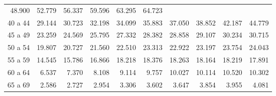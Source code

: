 \begin{tabular}{llllllllll}
  \multicolumn{1}{r}{48.900} &
  \multicolumn{1}{r}{52.779} &
  \multicolumn{1}{r}{56.337} &
  \multicolumn{1}{r}{59.596} &
  \multicolumn{1}{r}{63.295} &
  \multicolumn{1}{r}{64.723} \\
\multicolumn{1}{l}{\hspace{1em}40 a 44} &
  \multicolumn{1}{|r}{29.144} &
  \multicolumn{1}{r}{30.723} &
  \multicolumn{1}{r}{32.198} &
  \multicolumn{1}{r}{34.099} &
  \multicolumn{1}{r}{35.883} &
  \multicolumn{1}{r}{37.050} &
  \multicolumn{1}{r}{38.852} &
  \multicolumn{1}{r}{42.187} &
  \multicolumn{1}{r}{44.779} \\
\multicolumn{1}{l}{\hspace{1em}45 a 49} &
  \multicolumn{1}{|r}{23.259} &
  \multicolumn{1}{r}{24.569} &
  \multicolumn{1}{r}{25.795} &
  \multicolumn{1}{r}{27.332} &
  \multicolumn{1}{r}{28.382} &
  \multicolumn{1}{r}{28.858} &
  \multicolumn{1}{r}{29.107} &
  \multicolumn{1}{r}{30.234} &
  \multicolumn{1}{r}{30.715} \\
\multicolumn{1}{l}{\hspace{1em}50 a 54} &
  \multicolumn{1}{|r}{19.807} &
  \multicolumn{1}{r}{20.727} &
  \multicolumn{1}{r}{21.560} &
  \multicolumn{1}{r}{22.510} &
  \multicolumn{1}{r}{23.313} &
  \multicolumn{1}{r}{22.922} &
  \multicolumn{1}{r}{23.197} &
  \multicolumn{1}{r}{23.754} &
  \multicolumn{1}{r}{24.043} \\
\multicolumn{1}{l}{\hspace{1em}55 a 59} &
  \multicolumn{1}{|r}{14.545} &
  \multicolumn{1}{r}{15.786} &
  \multicolumn{1}{r}{16.866} &
  \multicolumn{1}{r}{18.218} &
  \multicolumn{1}{r}{18.376} &
  \multicolumn{1}{r}{18.263} &
  \multicolumn{1}{r}{18.164} &
  \multicolumn{1}{r}{18.219} &
  \multicolumn{1}{r}{17.891} \\
\multicolumn{1}{l}{\hspace{1em}60 a 64} &
  \multicolumn{1}{|r}{6.537} &
  \multicolumn{1}{r}{7.370} &
  \multicolumn{1}{r}{8.108} &
  \multicolumn{1}{r}{9.114} &
  \multicolumn{1}{r}{9.757} &
  \multicolumn{1}{r}{10.027} &
  \multicolumn{1}{r}{10.114} &
  \multicolumn{1}{r}{10.520} &
  \multicolumn{1}{r}{10.302} \\
\multicolumn{1}{l}{\hspace{1em}65 a 69} &
  \multicolumn{1}{|r}{2.586} &
  \multicolumn{1}{r}{2.727} &
  \multicolumn{1}{r}{2.954} &
  \multicolumn{1}{r}{3.306} &
  \multicolumn{1}{r}{3.602} &
  \multicolumn{1}{r}{3.647} &
  \multicolumn{1}{r}{3.854} &
  \multicolumn{1}{r}{3.955} &
  \multicolumn{1}{r}{4.081} \\

\end{tabular}

